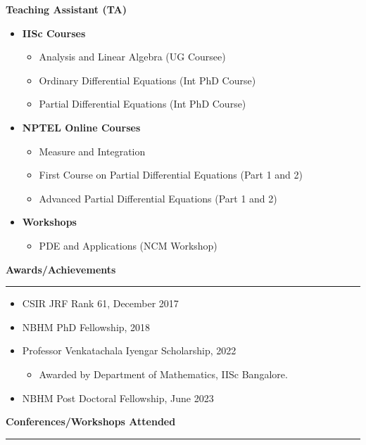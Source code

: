 \documentclass[a4paper,11pt]{letter}
\begin{document}
	\textbf{Teaching Assistant (TA)}
	\begin{itemize}
		\item \textbf{IISc Courses}
		\begin{itemize}
			\item Analysis and Linear Algebra (UG Coursee)
			\item Ordinary Differential Equations (Int PhD Course)
			\item Partial Differential Equations (Int PhD Course)
		\end{itemize}
		\item \textbf{NPTEL Online Courses}
		\begin{itemize}
			\item Measure and Integration
			\item First Course on Partial Differential Equations (Part 1 and 2)
			\item Advanced Partial Differential Equations (Part 1 and 2)
		\end{itemize}
		\item \textbf{Workshops}
		\begin{itemize}
			\item PDE and Applications (NCM Workshop)
		\end{itemize}
	\end{itemize}
	
	\textbf{\large Awards/Achievements}\smallskip\hrule
	
	\begin{itemize}
		\item CSIR JRF Rank 61, December 2017
		\item NBHM PhD Fellowship, 2018
		\item Professor Venkatachala Iyengar Scholarship, 2022
		\begin{itemize}
			\item Awarded by Department of Mathematics, IISc Bangalore.
		\end{itemize}
		\item NBHM Post Doctoral Fellowship, June 2023
	\end{itemize}

	\textbf{\large Conferences/Workshops Attended}\smallskip\hrule
\end{document}

